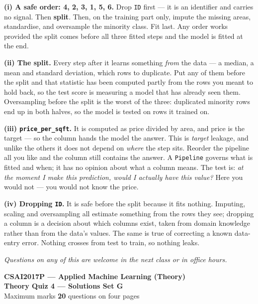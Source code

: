 \documentclass[10pt,a4paper]{article}
\newcommand{\SetLetter}{}
\begin{document}
\textbf{(i) A safe order: 4, 2, 3, 1, 5, 6.} Drop \texttt{ID} first --- it is an identifier and carries no signal. Then \textbf{split}. Then, on the training part only, impute the missing areas, standardise, and oversample the minority class. Fit last. Any order works provided the split comes before all three fitted steps and the model is fitted at the end.\par\vspace{1mm}\textbf{(ii) The split.} Every step after it learns something \emph{from} the data --- a median, a mean and standard deviation, which rows to duplicate. Put any of them before the split and that statistic has been computed partly from the rows you meant to hold back, so the test score is measuring a model that has already seen them. Oversampling before the split is the worst of the three: duplicated minority rows end up in both halves, so the model is tested on rows it trained on.\par\vspace{1mm}\textbf{(iii) \texttt{price\_per\_sqft}.} It is computed as price divided by area, and price is the target --- so the column hands the model the answer. This is \emph{target} leakage, and unlike the others it does not depend on \emph{where} the step sits. Reorder the pipeline all you like and the column still contains the answer. A \texttt{Pipeline} governs what is fitted and when; it has no opinion about what a column means. The test is: \emph{at the moment I make this prediction, would I actually have this value?} Here you would not --- you would not know the price.\par\vspace{1mm}\textbf{(iv) Dropping \texttt{ID}.} It is safe before the split because it fits nothing. Imputing, scaling and oversampling all estimate something from the rows they see; dropping a column is a decision about which columns exist, taken from domain knowledge rather than from the data's values. The same is true of correcting a known data-entry error. Nothing crosses from test to train, so nothing leaks.

\vfill

{\footnotesize\itshape Questions on any of this are welcome in the next class or in office hours.}

\newpage


\renewcommand{\SetLetter}{G}\setcounter{page}{1}

\begin{center}
{\large\bfseries CSAI2017P --- Applied Machine Learning (Theory)}\\[2pt]
{\large\bfseries Theory Quiz 4 --- Solutions \quad\textbullet\quad Set G}\\[3pt]
{\small Maximum marks \textbf{20} \quad\textbullet{} questions on four pages}
\end{center}
\vspace{2pt}
\end{document}
